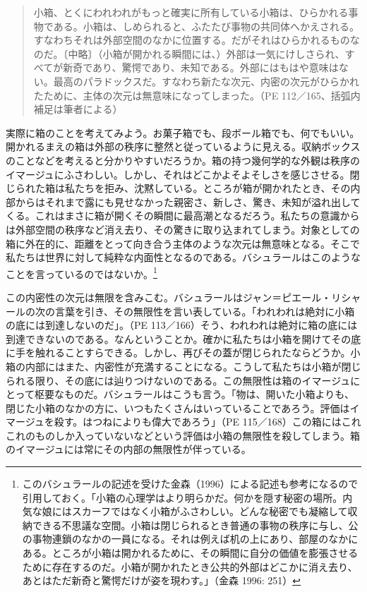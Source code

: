 \documentclass[b5j,twoside,twocolumn]{utarticle}
\begin{document}
\begin{quote}
小箱、とくにわれわれがもっと確実に所有している小箱は、ひらかれる事物である。小箱は、しめられると、ふたたび事物の共同体へかえされる。すなわちそれは外部空間のなかに位置する。だがそれはひらかれるものなのだ。〔中略〕（小箱が開かれる瞬間には、）外部は一気にけしさられ、すべてが新奇であり、驚愕であり、未知である。外部にはもはや意味はない。最高のパラドックスだ。すなわち新たな次元、内密の次元がひらかれたために、主体の次元は無意味になってしまった。（PE 112／165、括弧内補足は筆者による）
\end{quote}
実際に箱のことを考えてみよう。お菓子箱でも、段ボール箱でも、何でもいい。開かれるまえの箱は外部の秩序に整然と従っているように見える。収納ボックスのことなどを考えると分かりやすいだろうか。箱の持つ幾何学的な外観は秩序のイマージュにふさわしい。しかし、それはどこかよそよそしさを感じさせる。閉じられた箱は私たちを拒み、沈黙している。ところが箱が開かれたとき、その内部からはそれまで露にも見せなかった親密さ、新しさ、驚き、未知が溢れ出してくる。これはまさに箱が開くその瞬間に最高潮となるだろう。私たちの意識からは外部空間の秩序など消え去り、その驚きに取り込まれてしまう。対象としての箱に外在的に、距離をとって向き合う主体のような次元は無意味となる。そこで私たちは世界に対して純粋な内面性となるのである。バシュラールはこのようなことを言っているのではないか。\footnote{このバシュラールの記述を受けた金森（1996）による記述も参考になるので引用しておく。「小箱の心理学はより明らかだ。何かを隠す秘密の場所。内気な娘にはスカーフではなく小箱がふさわしい。どんな秘密でも凝縮して収納できる不思議な空間。小箱は閉じられるとき普通の事物の秩序に与し、公の事物連鎖のなかの一員になる。それは例えば机の上にあり、部屋のなかにある。ところが小箱は開かれるために、その瞬間に自分の価値を膨張させるために存在するのだ。小箱が開かれたとき公共的外部はどこかに消え去り、あとはただ新奇と驚愕だけが姿を現わす。」（金森 1996: 251）}


この内密性の次元は無限を含みこむ。バシュラールはジャン＝ピエール・リシャールの次の言葉を引き、その無限性を言い表している。「われわれは絶対に小箱の底には到達しないのだ」。（PE 113／166）そう、われわれは絶対に箱の底には到達できないのである。なんということか。確かに私たちは小箱を開けてその底に手を触れることすらできる。しかし、再びその蓋が閉じられたならどうか。小箱の内部にはまた、内密性が充満することになる。こうして私たちは小箱が閉じられる限り、その底には辿りつけないのである。この無限性は箱のイマージュにとって枢要なものだ。バシュラールはこうも言う。「物は、開いた小箱よりも、閉じた小箱のなかの方に、いつもたくさんはいっていることであろう。評価はイマージュを殺す。はつねによりも偉大であろう」（PE 115／168）この箱にはこれこれのものしか入っていないなどという評価は小箱の無限性を殺してしまう。箱のイマージュには常にその内部の無限性が伴っている。
\end{document}

